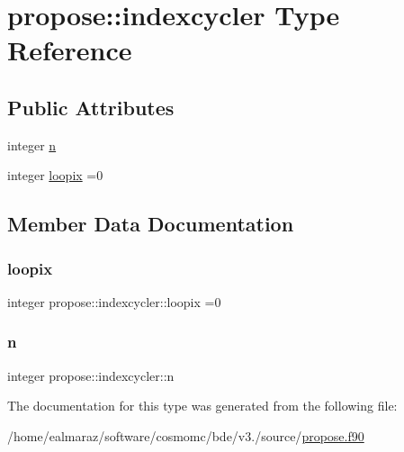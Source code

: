 \hypertarget{structpropose_1_1indexcycler}{}\section{propose\+:\+:indexcycler Type Reference}
\label{structpropose_1_1indexcycler}
\subsection*{Public Attributes}
\begin{DoxyCompactItemize}
\item 
integer \mbox{\hyperlink{structpropose_1_1indexcycler_aea945d4dc79029eda6ad3f849f261f03}{n}}
\item 
integer \mbox{\hyperlink{structpropose_1_1indexcycler_a50f92d06414c8848cd15d4e836eb3a23}{loopix}} =0
\end{DoxyCompactItemize}


\subsection{Member Data Documentation}
\mbox{\label{structpropose_1_1indexcycler_a50f92d06414c8848cd15d4e836eb3a23}} 
\subsubsection{\texorpdfstring{loopix}{loopix}}
{\footnotesize\ttfamily integer propose\+::indexcycler\+::loopix =0}

\mbox{\label{structpropose_1_1indexcycler_aea945d4dc79029eda6ad3f849f261f03}} 
\subsubsection{\texorpdfstring{n}{n}}
{\footnotesize\ttfamily integer propose\+::indexcycler\+::n}



The documentation for this type was generated from the following file\+:\begin{DoxyCompactItemize}
\item 
/home/ealmaraz/software/cosmomc/bde/v3./source/\mbox{\hyperlink{propose_8f90}{propose.\+f90}}\end{DoxyCompactItemize}
